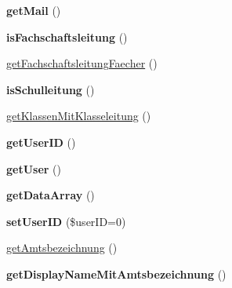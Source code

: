 \begin{DoxyCompactItemize}
{\bfseries get\+Mail} ()
\item 
\mbox{\label{classlehrer_a0ac9a86ef28c03a18d43defc2e2cda52}} 
{\bfseries is\+Fachschaftsleitung} ()
\item 
\mbox{\hyperlink{classlehrer_a54b2f256532f40995d12bd1be85e30ed}{get\+Fachschaftsleitung\+Faecher}} ()
\item 
\mbox{\label{classlehrer_af7cedda33c3b6e210f99b9189cdaf220}} 
{\bfseries is\+Schulleitung} ()
\item 
\mbox{\hyperlink{classlehrer_aa6bf732c34bc2021887292a9d53bff8c}{get\+Klassen\+Mit\+Klasseleitung}} ()
\item 
\mbox{\label{classlehrer_a604d89925fe88179d831e061851da740}} 
{\bfseries get\+User\+ID} ()
\item 
\mbox{\label{classlehrer_af2b567c6e692b4c92a375e809bf0771c}} 
{\bfseries get\+User} ()
\item 
\mbox{\label{classlehrer_a9e73c456c1617d58c10e3d1696774949}} 
{\bfseries get\+Data\+Array} ()
\item 
\mbox{\label{classlehrer_a8aa213a63dd588066ce9f8cec559d5e4}} 
{\bfseries set\+User\+ID} (\$user\+ID=0)
\item 
\mbox{\hyperlink{classlehrer_a2c1fe9939bbab5ff9e1ae1ec72c6a01e}{get\+Amtsbezeichnung}} ()
\item 
\mbox{\label{classlehrer_a7358f31155ea8310dce2987a2b828010}} 
{\bfseries get\+Display\+Name\+Mit\+Amtsbezeichnung} ()
\end{DoxyCompactItemize}
